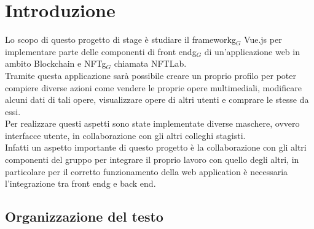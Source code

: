 
\chapter{Introduzione}
\label{cap:introduzione}

Lo scopo di questo progetto di stage è studiare il \gls{frameworkg}$_G$ Vue.js per implementare parte delle componenti di \gls{front endg}$_G$ di un'applicazione web in ambito Blockchain e \gls{NFTg}$_G$ chiamata NFTLab. \\
Tramite questa applicazione sarà possibile creare un proprio profilo per poter compiere diverse azioni come vendere le proprie opere multimediali, modificare alcuni dati di tali opere, visualizzare opere di altri utenti e comprare le stesse da essi. \\
Per realizzare questi aspetti sono state implementate diverse maschere, ovvero interfacce utente, in collaborazione con gli altri colleghi stagisti.\\
Infatti un aspetto importante di questo progetto è la collaborazione con gli altri componenti del gruppo per integrare il proprio lavoro con quello degli altri, in particolare per il corretto funzionamento della web application è necessaria l'integrazione tra \gls{front endg} e back end.


\section{Organizzazione del testo}

